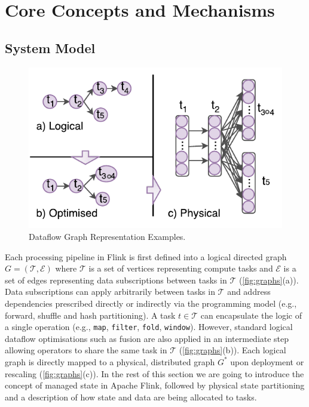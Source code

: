 
\section{Core Concepts and Mechanisms}
\label{sec:core}

\subsection{System Model}

\begin{figure}[h]
\centering
\includegraphics[width=\textwidth / 2]{figures/graphs.pdf}
\caption{Dataflow Graph Representation Examples.} 
\label{fig:graphs}
\vspace{-4mm}
\end{figure}

Each processing pipeline in Flink is first defined into a logical directed graph $G = (\mathcal{T}, \mathcal{E})$ where $\mathcal{T}$ is a set of vertices representing compute tasks and $\mathcal{E}$ is a set of edges representing data subscriptions between tasks in $\mathcal{T}$ (\autoref{fig:graphs}(a)). Data subscriptions can apply arbitrarily between tasks in $\mathcal{T}$ and address dependencies prescribed directly or indirectly via the programming model (e.g., forward, shuffle and hash partitioning). A task $t \in \mathcal{T}$ can encapsulate the logic of a single operation (e.g., \texttt{map}, \texttt{filter}, \texttt{fold}, \texttt{window}). However, standard logical dataflow optimisations  such as fusion \cite{hirzel2014catalog,chambers2010flumejava} are also applied in an intermediate step allowing operators to share the same task in $\mathcal{T}$ (\autoref{fig:graphs}(b)). Each logical graph is directly mapped to a physical, distributed graph $G^*$ upon deployment or rescaling (\autoref{fig:graphs}(c)). In the rest of this section we are going to introduce the concept of managed state in Apache Flink, followed by physical state partitioning and a description of how state and data are being allocated to tasks.

